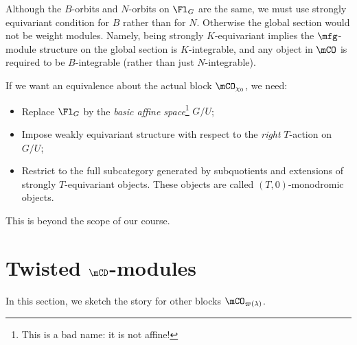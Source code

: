 	\begin{warn}
		Although the $B$-orbits and $N$-orbits on $\Fl_G$ are the same, we must use strongly equivariant condition for $B$ rather than for $N$. Otherwise the global section would not be weight modules. Namely, being strongly $K$-equivariant implies the $\mfg$-module structure on the global section is $K$-integrable, and any object in $\mCO$ is required to be $B$-integrable (rather than just $N$-integrable).
	\end{warn}
	
	\begin{rem}
		If we want an equivalence about the actual block $\mCO_{\chi_0}$, we need:
		\begin{itemize}
			\item 
				Replace $\Fl_G$ by the \emph{basic affine space}\footnote{This is a bad name: it is not affine!} $G/U$;
			\item
				Impose weakly equivariant structure with respect to the \emph{right} $T$-action on $G/U$;
			\item
				Restrict to the full subcategory generated by subquotients and extensions of strongly $T$-equivariant objects. These objects are called $(T,0)$-monodromic objects.
		\end{itemize}
		This is beyond the scope of our course.

	\end{rem}


\section{Twisted \texorpdfstring{$\mCD$}{D}-modules}

	In this section, we sketch the story for other blocks $\mCO_{\varpi(\lambda)}$.

